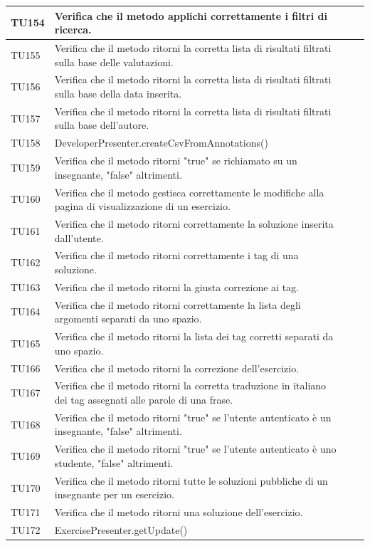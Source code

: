\begin{longtable}{|>{\centering\arraybackslash}m{1.6cm}|>{\centering\arraybackslash}m{6.41cm}|>{\centering\arraybackslash}m{3.1cm}| c |}
		TU154 & Verifica che il metodo applichi correttamente i filtri di ricerca. \\ \hline
		TU155 & Verifica che il metodo ritorni la corretta lista di risultati filtrati sulla base delle valutazioni.\\ \hline
		TU156 & Verifica che il metodo ritorni la corretta lista di risultati filtrati sulla base della data inserita.\\ \hline
		TU157 & Verifica che il metodo ritorni la corretta lista di risultati filtrati sulla base dell'autore.\\ \hline
		TU158 & DeveloperPresenter.createCsvFromAnnotations()\\ \hline
		TU159 & Verifica che il metodo ritorni "true" se richiamato su un insegnante, "false" altrimenti. \\ \hline
		TU160 & Verifica che il metodo gestisca correttamente le modifiche alla pagina di visualizzazione di un esercizio. \\ \hline
		TU161 & Verifica che il metodo ritorni correttamente la soluzione inserita dall'utente. \\ \hline
		TU162 & Verifica che il metodo ritorni correttamente i tag di una soluzione. \\ \hline
		TU163 & Verifica che il metodo ritorni la giusta correzione ai tag. \\ \hline
		TU164 & Verifica che il metodo ritorni correttamente la lista degli argomenti separati da uno spazio. \\ \hline
		TU165 & Verifica che il metodo ritorni la lista dei tag corretti separati da uno spazio. \\ \hline
		TU166 & Verifica che il metodo ritorni la correzione dell'esercizio. \\ \hline
		TU167 & Verifica che il metodo ritorni la corretta traduzione in italiano dei tag assegnati alle parole di una frase. \\ \hline
		TU168 & Verifica che il metodo ritorni "true" se l'utente autenticato è un insegnante, "false" altrimenti. \\ \hline
		TU169 & Verifica che il metodo ritorni "true" se l'utente autenticato è uno studente, "false" altrimenti. \\ \hline
		TU170 & Verifica che il metodo ritorni tutte le soluzioni pubbliche di un insegnante per un esercizio. \\ \hline
		TU171 & Verifica che il metodo ritorni una soluzione dell'esercizio. \\ \hline
		TU172 & ExercisePresenter.getUpdate()\\ \hline

\end{longtable}

